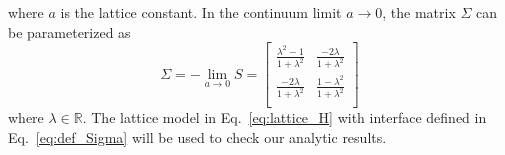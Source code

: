where $a$ is the lattice constant. In the continuum limit $a\rightarrow0$, the matrix $\Sigma$ can be parameterized as
\begin{equation}
\label{eq:def_Sigma}
\Sigma = -\lim_{a \rightarrow 0 } S = 
\begin{bmatrix}
\frac{\lambda^2- 1}{1 + \lambda^2} & \frac{-2\lambda }{1 + \lambda^2} \\
\frac{-2\lambda }{1 + \lambda^2} & \frac{1- \lambda^2}{1 + \lambda^2} \\
\end{bmatrix}
\end{equation}
where $\lambda\in\mathbb{R}$. The lattice model in Eq.~\eqref{eq:lattice_H} with interface defined in Eq.~\eqref{eq:def_Sigma} will be used to check our analytic results. 


